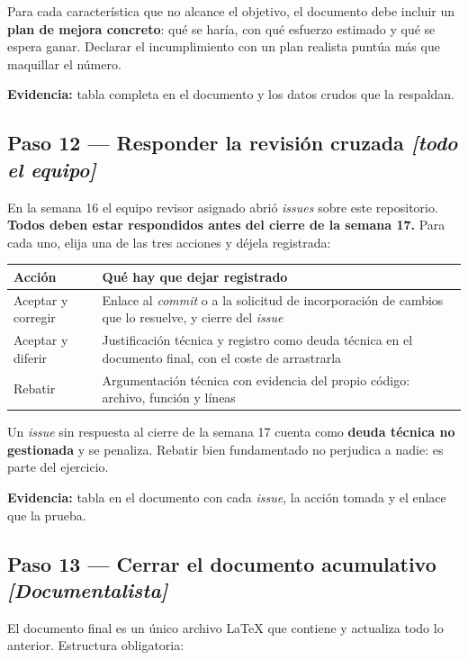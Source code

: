 \documentclass[11pt,a4paper]{article}
\newcommand{\paso}[1]{\subsection{#1}}
\begin{document}
	Para cada característica que no alcance el objetivo, el documento debe incluir un \textbf{plan de mejora concreto}: qué se haría, con qué esfuerzo estimado y qué se espera ganar. Declarar el incumplimiento con un plan realista puntúa más que maquillar el número.
	
	\textbf{Evidencia:} tabla completa en el documento y los datos crudos que la respaldan.
	
	\paso{Paso 12 --- Responder la revisión cruzada \emph{[todo el equipo]}}
	
	En la semana 16 el equipo revisor asignado abrió \emph{issues} sobre este repositorio. \textbf{Todos deben estar respondidos antes del cierre de la semana 17.} Para cada uno, elija una de las tres acciones y déjela registrada:
	
	\begin{center}
		\small
		\begin{tabular}{@{}p{3.6cm}p{11.3cm}@{}}
			\toprule
			\textbf{Acción} & \textbf{Qué hay que dejar registrado} \\
			\midrule
			Aceptar y corregir & Enlace al \emph{commit} o a la solicitud de incorporación de cambios que lo resuelve, y cierre del \emph{issue} \\
			\addlinespace
			Aceptar y diferir & Justificación técnica y registro como deuda técnica en el documento final, con el coste de arrastrarla \\
			\addlinespace
			Rebatir & Argumentación técnica con evidencia del propio código: archivo, función y líneas \\
			\bottomrule
		\end{tabular}
	\end{center}
	
	Un \emph{issue} sin respuesta al cierre de la semana 17 cuenta como \textbf{deuda técnica no gestionada} y se penaliza. Rebatir bien fundamentado no perjudica a nadie: es parte del ejercicio.
	
	\textbf{Evidencia:} tabla en el documento con cada \emph{issue}, la acción tomada y el enlace que la prueba.
	
	\paso{Paso 13 --- Cerrar el documento acumulativo \emph{[Documentalista]}}
	
	El documento final es un único archivo LaTeX que contiene y actualiza todo lo anterior. Estructura obligatoria:
	
\end{document}
